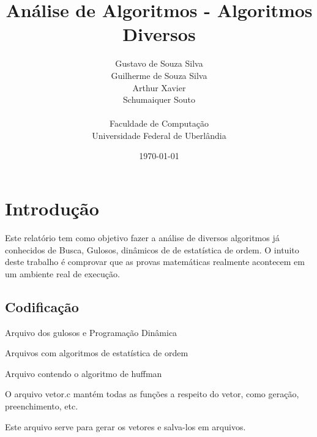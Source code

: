 \documentclass[12pt,a4paper,twoside]{report}
\title{Análise de Algoritmos - Algoritmos Diversos}
\date{}
\author{Gustavo de Souza Silva \\ Guilherme de Souza Silva \\ Arthur Xavier \\ Schumaiquer Souto \\
\vspace{1cm} \\
Faculdade de Computação \\
Universidade Federal de Uberlândia
}
\date{\today}
\begin{document}
  \maketitle
\listoffigures            
\listoftables            
\lstlistoflistings

\tableofcontents    


\fancyhead[RE,LO]{\thesection}

\setlength{\parskip}{0.15in} %

\chapter{Introdução}
Este relatório tem como objetivo fazer a análise de diversos algoritmos já conhecidos de Busca, Gulosos, dinâmicos de de estatística de ordem. O intuito deste trabalho é comprovar que as provas matemáticas realmente acontecem em um ambiente real de execução.

\section{Codificação}
Arquivo dos gulosos e Programação Dinâmica


Arquivos com algoritmos de estatística de ordem


Arquivo contendo o algoritmo de huffman


O arquivo vetor.c mantém todas as funções a respeito do vetor, como geração, preenchimento, etc.


Este arquivo serve para gerar os vetores e salva-los em arquivos.

\end{document}
